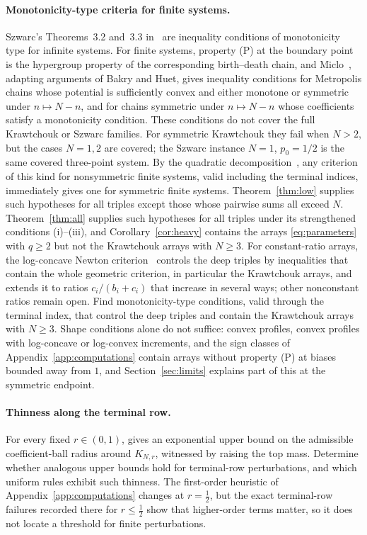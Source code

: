 \paragraph{Monotonicity-type criteria for finite systems.}
Szwarc's Theorems~3.2 and~3.3 in~\cite{szwarc} are inequality conditions of monotonicity type for infinite systems. For finite systems, property (P) at the boundary point is the hypergroup property of the corresponding birth--death chain, and Miclo~\cite[Proposition~6 and Theorem~31]{miclo2015}, adapting arguments of Bakry and Huet, gives inequality conditions for Metropolis chains whose potential is sufficiently convex and either monotone or symmetric under $n\mapsto N-n$, and for chains symmetric under $n\mapsto N-n$ whose coefficients satisfy a monotonicity condition. These conditions do not cover the full Krawtchouk or Szwarc families. For symmetric Krawtchouk they fail when $N>2$, but the cases $N=1,2$ are covered; the Szwarc instance $N=1$, $p_0=1/2$ is the same covered three-point system. By the quadratic decomposition~\cite[Theorem~]{P1}, any criterion of this kind for nonsymmetric finite systems, valid including the terminal indices, immediately gives one for symmetric finite systems. Theorem~\ref{thm:low} supplies such hypotheses for all triples except those whose pairwise sums all exceed $N$. Theorem~\ref{thm:all} supplies such hypotheses for all triples under its strengthened conditions (i)--(iii), and Corollary~\ref{cor:heavy} contains the arrays \eqref{eq:parameters} with $q\geq2$ but not the Krawtchouk arrays with $N\geq3$. For constant-ratio arrays, the log-concave Newton criterion~\cite[Theorem~]{P1} controls the deep triples by inequalities that contain the whole geometric criterion, in particular the Krawtchouk arrays, and~\cite{P2} extends it to ratios $c_i/(b_i+c_i)$ that increase in several ways; other nonconstant ratios remain open. Find monotonicity-type conditions, valid through the terminal index, that control the deep triples and contain the Krawtchouk arrays with $N\geq3$. Shape conditions alone do not suffice: convex profiles, convex profiles with log-concave or log-convex increments, and the sign classes of Appendix~\ref{app:computations} contain arrays without property (P) at biases bounded away from $1$, and Section~\ref{sec:limits} explains part of this at the symmetric endpoint.

\paragraph{Thinness along the terminal row.}
For every fixed $r\in(0,1)$, \cite[Corollary~]{P1} gives an exponential upper bound on the admissible coefficient-ball radius around $K_{N,r}$, witnessed by raising the top mass. Determine whether analogous upper bounds hold for terminal-row perturbations, and which uniform rules exhibit such thinness. The first-order heuristic of Appendix~\ref{app:computations} changes at $r=\tfrac12$, but the exact terminal-row failures recorded there for $r\leq\tfrac12$ show that higher-order terms matter, so it does not locate a threshold for finite perturbations.

